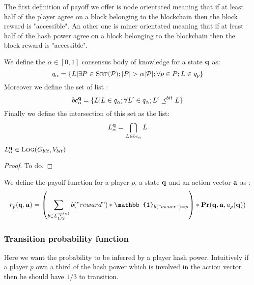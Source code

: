 The first definition of payoff we offer is node orientated meaning that if at least half of the player agree on a block belonging to the blockchain then the block reward is "accessible". An other one is miner orientated meaning that if at least half of the hash power agree on a block belonging to the blockchain then the block reward is "accessible".





We define the $\alpha \in [0,1]$ consensus body of knowledge for a state $\mathbf{q}$ as: 
$$q_{\alpha} = \{L | \exists P \in \set(\cP); |P|> \alpha |\cP|;\forall p \in P; L\in q_p \}$$
Moreover we define the set of list :
$$bc_{\alpha}^{\mathbf{q}} = \{L |L\in q_{\alpha} ;\forall L' \in q_{\alpha}; L'\preceq^{bit} L \} $$
Finally we define the intersection of this set as the list:
$$L_\alpha^{\mathbf{q}} = \bigcap_{L \in bc_{\alpha}} L$$

\begin{mylem*}
	$L_\alpha^{\mathbf{q}} \in \text{\sc Log}(G_{bit},V_{bit})$
\end{mylem*}
\begin{proof}
	To do.
\end{proof}

\begin{mydef}
We define the payoff function for a player $p$, a state $\mathbf{q}$ and an action vector $\mathbf{a}$ as : 
$$ r_p(\bq,\ba) = \left ( \sum_{b \in L_{1/2}^{a_p(\bq)}} b("reward") * \mathbb{1}_{b("owner")=p} \right ) * \pr(\bq, \ba, a_p(\bq))$$
\end{mydef}




\subsubsection{Transition probability function}
Here we want the probability to be inferred by a player hash power. Intuitively if a player $p$ own a third of the hash power which is involved in the action vector then he should have $1/3$ to transition. 


